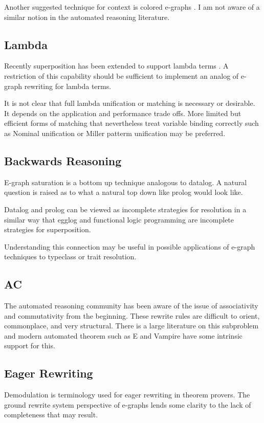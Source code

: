 \documentclass[sigplan,10pt,review,anonymous]{acmart}
\begin{document}
Another suggested technique for context is colored e-graphs \cite{singher2023colored}. I am not aware of a similar notion in the automated reasoning literature. 

\subsection{Lambda}
Recently superposition has been extended to support lambda terms \cite{bentkampsuperposition}. A restriction of this capability should be sufficient to implement an analog of e-graph rewriting for lambda terms.

It is not clear that full lambda unification or matching is necessary or desirable. It depends on the application and performance trade offs. More limited but efficient forms of matching that nevertheless treat variable binding correctly such as Nominal unification \cite{nominal} or Miller patterm unification \cite{miller} may be preferred.

\subsection{Backwards Reasoning}
E-graph saturation is a bottom up technique analogous to datalog. A natural question is raised as to what a natural top down like prolog would look like.

Datalog and prolog can be viewed as incomplete strategies for resolution in a similar way that egglog \cite{egglog} and functional logic programming are incomplete strategies for superposition.

Understanding this connection may be useful in possible applications of e-graph techniques to typeclass or trait resolution.

\subsection{AC}
The automated reasoning community has been aware of the issue of associativity and commutativity from the beginning. These rewrite rules are difficult to orient, commonplace, and very structural. There is a large literature on this subproblem and modern automated theorem such as E and Vampire have some intrinsic support for this. 

\subsection{Eager Rewriting}
Demodulation is terminology used for eager rewriting in theorem provers. The ground rewrite system perspective of e-graphs lends some clarity to the lack of completeness that may result.
\end{document}
